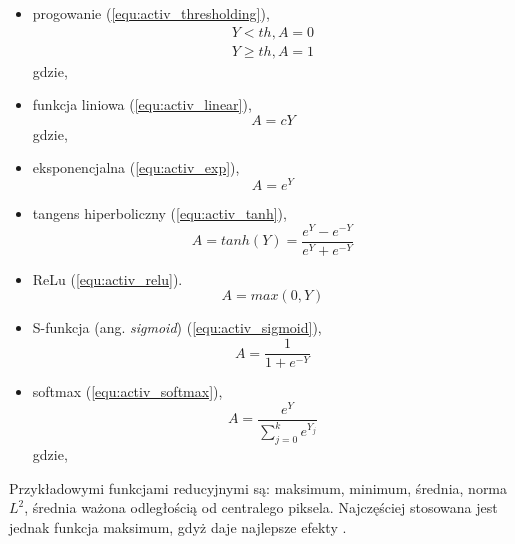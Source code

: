 {\begin{itemize}
\item progowanie (\ref{equ:activ_thresholding}),
\begin{equation}
\begin{aligned}
Y < th, A = 0\\
Y \geq th, A = 1
\end{aligned}
\label{equ:activ_thresholding}
\end{equation}
gdzie,
\item funkcja liniowa (\ref{equ:activ_linear}),
\begin{equation}
A = cY
\label{equ:activ_linear}
\end{equation}
gdzie,
\item eksponencjalna (\ref{equ:activ_exp}),
\begin{equation}
A = e^{Y}
\label{equ:activ_exp}
\end{equation}
\item tangens hiperboliczny (\ref{equ:activ_tanh}),
\begin{equation}
A = tanh(Y) =  \frac{e^{Y} - e^{-Y}}{e^{Y} + e^{-Y}}
\label{equ:activ_tanh}
\end{equation}
\item ReLu (\ref{equ:activ_relu}).
\begin{equation}
A = max(0,Y)
\label{equ:activ_relu}
\end{equation}

\item S-funkcja (ang. \textit{sigmoid}) (\ref{equ:activ_sigmoid}),
\begin{equation}
A = \frac{1}{1+e^{-Y}}
\label{equ:activ_sigmoid}
\end{equation}
\item softmax (\ref{equ:activ_softmax}),
\begin{equation}
A = \frac{e^{Y}}{\sum_{j=0}^{k} e^{Y_j}}
\label{equ:activ_softmax}
\end{equation}
gdzie,
\end{itemize}

Przykładowymi funkcjami reducyjnymi są: maksimum, minimum, średnia, norma \begin{math}L^{2}\end{math}, średnia ważona odległością od centralego piksela. Najczęściej stosowana jest jednak funkcja maksimum, gdyż daje najlepsze efekty \cite{Scherer2010EvaluationOP}.
}

